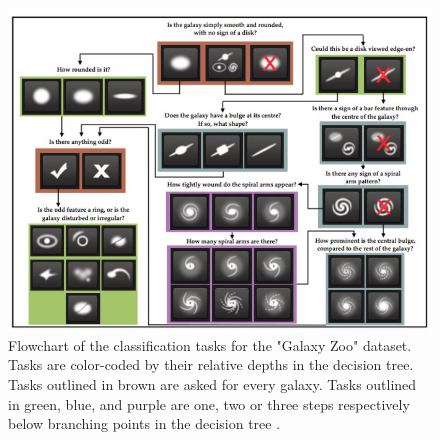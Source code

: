 \begin{figure}[h] \label{decision-tree}
  \centering
  \includegraphics[scale=0.9]{figures/decision-tree.jpg}
  \caption{Flowchart of the classification tasks for the "Galaxy Zoo" dataset. Tasks are color-coded by their relative depths in the decision tree. Tasks outlined in brown are asked for every galaxy. Tasks outlined in green, blue, and purple are one, two or three steps respectively below branching points in the decision tree \cite{galaxyzoo2}.}
\end{figure}
